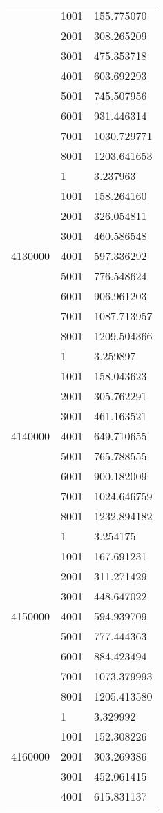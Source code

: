 \begin{table}[htb!]
\begin{tabular}{lll}
 & 1001 & 155.775070 \\
 & 2001 & 308.265209 \\
 & 3001 & 475.353718 \\
 & 4001 & 603.692293 \\
 & 5001 & 745.507956 \\
 & 6001 & 931.446314 \\
 & 7001 & 1030.729771 \\
 & 8001 & 1203.641653 \\
\multirow[c]{9}{*}{4130000} & 1 & 3.237963 \\
 & 1001 & 158.264160 \\
 & 2001 & 326.054811 \\
 & 3001 & 460.586548 \\
 & 4001 & 597.336292 \\
 & 5001 & 776.548624 \\
 & 6001 & 906.961203 \\
 & 7001 & 1087.713957 \\
 & 8001 & 1209.504366 \\
\multirow[c]{9}{*}{4140000} & 1 & 3.259897 \\
 & 1001 & 158.043623 \\
 & 2001 & 305.762291 \\
 & 3001 & 461.163521 \\
 & 4001 & 649.710655 \\
 & 5001 & 765.788555 \\
 & 6001 & 900.182009 \\
 & 7001 & 1024.646759 \\
 & 8001 & 1232.894182 \\
\multirow[c]{9}{*}{4150000} & 1 & 3.254175 \\
 & 1001 & 167.691231 \\
 & 2001 & 311.271429 \\
 & 3001 & 448.647022 \\
 & 4001 & 594.939709 \\
 & 5001 & 777.444363 \\
 & 6001 & 884.423494 \\
 & 7001 & 1073.379993 \\
 & 8001 & 1205.413580 \\
\multirow[c]{9}{*}{4160000} & 1 & 3.329992 \\
 & 1001 & 152.308226 \\
 & 2001 & 303.269386 \\
 & 3001 & 452.061415 \\
 & 4001 & 615.831137 \\

\end{tabular}
\end{table}
